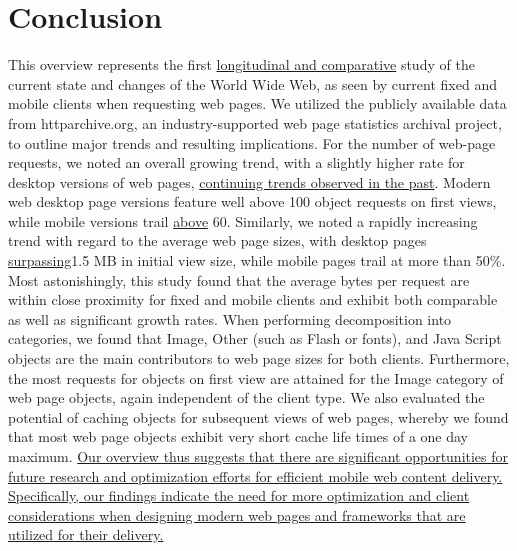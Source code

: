 \documentclass[onecolumn,12pt]{IEEEtran}
\begin{document}
\section{Conclusion}
\label{s:conc}
This overview represents the first \uline{longitudinal and comparative} study of the current state and changes of the World Wide Web, as seen by current fixed and mobile clients when requesting web pages.
We utilized the publicly available data from httparchive.org, an industry-supported web page statistics archival project, to outline major trends and resulting implications.
For the number of web-page requests, we noted an overall growing trend, with a slightly higher rate for desktop versions of web pages, \uline{continuing trends observed in the past}. 
Modern web desktop page versions feature well above 100 object requests on first views, while mobile versions trail \uline{above} 60.
Similarly, we noted a rapidly increasing trend with regard to the average web page sizes, with desktop pages \uline{surpassing}1.5 MB in initial view size, while mobile pages trail at more than 50\%.
Most astonishingly, this study found that the average bytes per request are within close proximity for fixed and mobile clients and exhibit both comparable as well as significant growth rates.
When performing decomposition into categories, we found that Image, Other (such as Flash or fonts), and Java Script objects are the main contributors to web page sizes for both clients. Furthermore, the most requests for objects on first view are attained for the Image category of web page objects, again independent of the client type.
We also evaluated the potential of caching objects for subsequent views of web pages, whereby we found that most web page objects exhibit very short cache life times of a one day maximum.
\uline{Our overview thus suggests that there are significant opportunities for future research and optimization efforts for efficient mobile web content delivery. 
Specifically, our findings indicate the need for more optimization and client considerations when designing modern web pages and frameworks that are utilized for their delivery.
}
\end{document}
